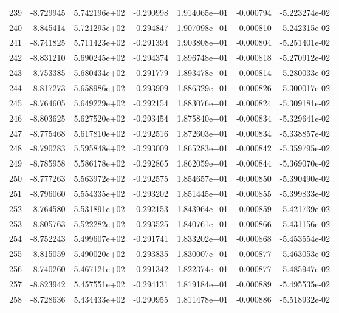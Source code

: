 \begin{tabular}{rrrrrrr}
 239 &  -8.729945 &  5.742196e+02 & -0.290998 &  1.914065e+01 &   -0.000794 & -5.223274e-02 \\
 240 &  -8.845414 &  5.721295e+02 & -0.294847 &  1.907098e+01 &   -0.000810 & -5.242315e-02 \\
 241 &  -8.741825 &  5.711423e+02 & -0.291394 &  1.903808e+01 &   -0.000804 & -5.251401e-02 \\
 242 &  -8.831210 &  5.690245e+02 & -0.294374 &  1.896748e+01 &   -0.000818 & -5.270912e-02 \\
 243 &  -8.753385 &  5.680434e+02 & -0.291779 &  1.893478e+01 &   -0.000814 & -5.280033e-02 \\
 244 &  -8.817273 &  5.658986e+02 & -0.293909 &  1.886329e+01 &   -0.000826 & -5.300017e-02 \\
 245 &  -8.764605 &  5.649229e+02 & -0.292154 &  1.883076e+01 &   -0.000824 & -5.309181e-02 \\
 246 &  -8.803625 &  5.627520e+02 & -0.293454 &  1.875840e+01 &   -0.000834 & -5.329641e-02 \\
 247 &  -8.775468 &  5.617810e+02 & -0.292516 &  1.872603e+01 &   -0.000834 & -5.338857e-02 \\
 248 &  -8.790283 &  5.595848e+02 & -0.293009 &  1.865283e+01 &   -0.000842 & -5.359795e-02 \\
 249 &  -8.785958 &  5.586178e+02 & -0.292865 &  1.862059e+01 &   -0.000844 & -5.369070e-02 \\
 250 &  -8.777263 &  5.563972e+02 & -0.292575 &  1.854657e+01 &   -0.000850 & -5.390490e-02 \\
 251 &  -8.796060 &  5.554335e+02 & -0.293202 &  1.851445e+01 &   -0.000855 & -5.399833e-02 \\
 252 &  -8.764580 &  5.531891e+02 & -0.292153 &  1.843964e+01 &   -0.000859 & -5.421739e-02 \\
 253 &  -8.805763 &  5.522282e+02 & -0.293525 &  1.840761e+01 &   -0.000866 & -5.431156e-02 \\
 254 &  -8.752243 &  5.499607e+02 & -0.291741 &  1.833202e+01 &   -0.000868 & -5.453554e-02 \\
 255 &  -8.815059 &  5.490020e+02 & -0.293835 &  1.830007e+01 &   -0.000877 & -5.463053e-02 \\
 256 &  -8.740260 &  5.467121e+02 & -0.291342 &  1.822374e+01 &   -0.000877 & -5.485947e-02 \\
 257 &  -8.823942 &  5.457551e+02 & -0.294131 &  1.819184e+01 &   -0.000889 & -5.495535e-02 \\
 258 &  -8.728636 &  5.434433e+02 & -0.290955 &  1.811478e+01 &   -0.000886 & -5.518932e-02 \\

\end{tabular}
